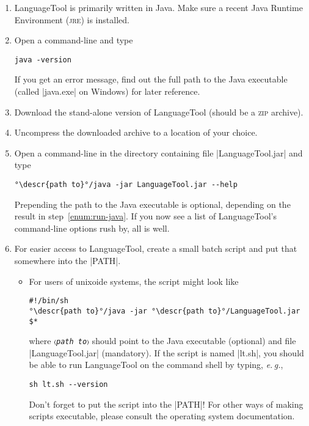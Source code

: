 \documentclass[11pt]{article}
\newcommand*{\acr}[1]{\mbox{\scshape#1}}
\newcommand*{\descr}[1]{〈\emph{#1}〉}
\newcommand*{\latinphrase}[1]{\foreignlanguage{latin}{\emph{#1}}}
\newcommand*{\lpeg}{\latinphrase{e.\,g.}\xspace}
\begin{document}
\begin{enumerate}

\item LanguageTool is primarily written in Java.  Make sure a recent
  Java Runtime Environment (\acr{jre}) is installed.

\item\label{enum:run-java} Open a command-line and type

\begin{lstlisting}
java -version
\end{lstlisting}
%
  If you get an error message, find out the full path to the Java
  executable (called |java.exe| on Windows) for later reference.

\item Download the stand-alone version of LanguageTool (should be a
  \acr{zip} archive).

\item Uncompress the downloaded archive to a location of your choice.

\item Open a command-line in the directory containing file
  |LanguageTool.jar| and type

\begin{lstlisting}[escapeinside=°°]
°\descr{path to}°/java -jar LanguageTool.jar --help
\end{lstlisting}
%
  Prepending the path to the Java executable is optional, depending on
  the result in step~\ref{enum:run-java}.  If you now see a list of
  LanguageTool's command-line options rush by, all is well.

\item For easier access to LanguageTool, create a small batch script and
  put that somewhere into the |PATH|.

  \begin{itemize}

  \item For users of unixoide systems, the script might look like

\begin{lstlisting}[escapeinside=°°]
#!/bin/sh
°\descr{path to}°/java -jar °\descr{path to}°/LanguageTool.jar $*
\end{lstlisting}
%
    where \texttt{\descr{path to}} should point to the Java executable
    (optional) and file |LanguageTool.jar| (mandatory).  If the script
    is named |lt.sh|, you should be able to run LanguageTool on the
    command shell by typing, \lpeg,

\begin{lstlisting}
sh lt.sh --version
\end{lstlisting}
%
    Don't forget to put the script into the |PATH|!  For other ways of
    making scripts executable, please consult the operating system
    documentation.


\end{itemize}
\end{enumerate}
\end{document}
